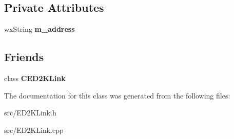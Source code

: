 \subsection*{Private Attributes}
\begin{DoxyCompactItemize}
\item 
wxString {\bfseries m\_\-address}\label{classCED2KServerListLink_a23351ebed1b4d562ec86dd0cf7e0d268}

\end{DoxyCompactItemize}
\subsection*{Friends}
\begin{DoxyCompactItemize}
\item 
class {\bf CED2KLink}\label{classCED2KServerListLink_a279e7ff00da60d35d82d2fff0a8cba76}

\end{DoxyCompactItemize}


The documentation for this class was generated from the following files:\begin{DoxyCompactItemize}
\item 
src/ED2KLink.h\item 
src/ED2KLink.cpp\end{DoxyCompactItemize}
